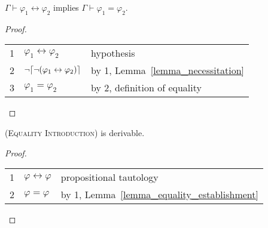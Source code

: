 \documentclass[acmsmall]{acmart}
\theoremstyle{acmdefinition}
\newcommand{\imp}{\to}
\newcommand{\dimp}{\leftrightarrow}
\newcommand{\prule}[1]{\textsc{(#1)}}
\DeclarePairedDelimiter{\ceil}{\lceil}{\rceil}
\begin{document}
\begin{lemma}
\label{lemma_equality_establishment}
$\Gamma \vdash \varphi_1 \dimp \varphi_2$ implies
$\Gamma \vdash \varphi_1 = \varphi_2$.
\end{lemma}
\begin{proof}\quad
\begin{center}
\begin{tabular}{l|ll}
		1 & $\varphi_1 \dimp \varphi_2$ & hypothesis \\
		2 & $\neg \ceil{\neg (\varphi_1 \dimp \varphi_2)}$ 
		  & by 1, Lemma~\ref{lemma_necessitation} \\
		3 & $\varphi_1 = \varphi_2$ 
		  & by 2, definition of equality
\end{tabular}
\end{center}
\end{proof}

\begin{lemma}
\label{lemma_equality_introduction}
\prule{Equality Introduction} is derivable.
\end{lemma}
\begin{proof}\quad
	\begin{center}
		\begin{tabular}{l|ll}
			1 & $\varphi \dimp \varphi$ 
			  & propositional tautology \\
			2 & $\varphi = \varphi$ 
			  & by 1, Lemma~\ref{lemma_equality_establishment}
		\end{tabular}
	\end{center}
\end{proof}

\begin{comment}
\begin{lemma}
\label{lemma_equality_implies_dimp}
$(\varphi_1 = \varphi_2) \imp (\varphi_1 \dimp \varphi_2)$ is derivable.
\end{lemma}
\begin{proof}
By definition of equality and FOL reasoning,
it suffices to derive
$\neg (\varphi_1 \dimp \varphi_2) 
\imp \ceil {\neg (\varphi_1 \dimp \varphi_2)}$.
The latter is derivable by Lemma~\ref{lemma_P_implies_ceil_P}.
\end{proof}
\end{comment}
\end{document}
